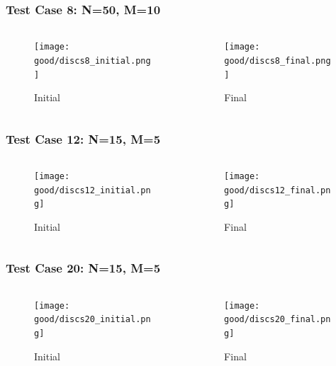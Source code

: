\documentclass[11pt]{beamer}
\begin{document}
\begin{frame}
\frametitle{Test Case 8: N=50, M=10}
\begin{columns}
\begin{column}{.45\textwidth}
\begin{figure}
  \texttt{[image: good/discs8\_initial.png]}
  \caption{Initial}
\end{figure}
\end{column}
\begin{column}{.45\textwidth}
\begin{figure}
  \texttt{[image: good/discs8\_final.png]}
  \caption{Final}
\end{figure}
\end{column}
\end{columns}
\end{frame}


\begin{frame}
\frametitle{Test Case 12: N=15, M=5}
\begin{columns}
\begin{column}{.45\textwidth}
\begin{figure}
  \texttt{[image: good/discs12\_initial.png]}
  \caption{Initial}
\end{figure}
\end{column}
\begin{column}{.45\textwidth}
\begin{figure}
  \texttt{[image: good/discs12\_final.png]}
  \caption{Final}
\end{figure}
\end{column}
\end{columns}
\end{frame}

\begin{frame}
\frametitle{Test Case 20: N=15, M=5}
\begin{columns}
\begin{column}{.45\textwidth}
\begin{figure}
  \texttt{[image: good/discs20\_initial.png]}
  \caption{Initial}
\end{figure}
\end{column}
\begin{column}{.45\textwidth}
\begin{figure}
  \texttt{[image: good/discs20\_final.png]}
  \caption{Final}
\end{figure}
\end{column}
\end{columns}
\end{frame}
\end{document}
